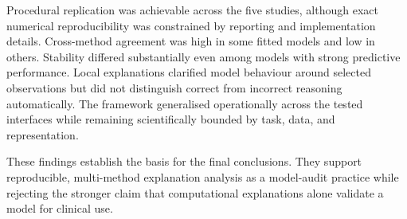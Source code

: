 Procedural replication was achievable across the five studies, although exact numerical reproducibility was constrained by reporting and implementation details. Cross-method agreement was high in some fitted models and low in others. Stability differed substantially even among models with strong predictive performance. Local explanations clarified model behaviour around selected observations but did not distinguish correct from incorrect reasoning automatically. The framework generalised operationally across the tested interfaces while remaining scientifically bounded by task, data, and representation.

These findings establish the basis for the final conclusions. They support reproducible, multi-method explanation analysis as a model-audit practice while rejecting the stronger claim that computational explanations alone validate a model for clinical use.
